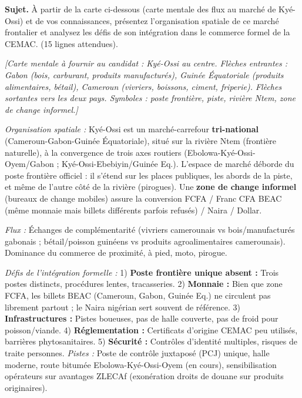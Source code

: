 \documentclass[11pt]{article}
\begin{document}
\begin{exercice}
\textbf{Sujet.} À partir de la carte ci-dessous (carte mentale des flux au marché de Kyé-Ossi) et de vos connaissances, présentez l'organisation spatiale de ce marché frontalier et analysez les défis de son intégration dans le commerce formel de la CEMAC. (15 lignes attendues).
\begin{center}
\textit{[Carte mentale à fournir au candidat : Kyé-Ossi au centre. Flèches entrantes : Gabon (bois, carburant, produits manufacturés), Guinée Équatoriale (produits alimentaires, bétail), Cameroun (vivriers, boissons, ciment, friperie). Flèches sortantes vers les deux pays. Symboles : poste frontière, piste, rivière Ntem, zone de change informel.]}
\end{center}
\end{exercice}

\begin{corrige}
\emph{Organisation spatiale :} Kyé-Ossi est un marché-carrefour \textbf{tri-national} (Cameroun-Gabon-Guinée Équatoriale), situé sur la rivière Ntem (frontière naturelle), à la convergence de trois axes routiers (Ebolowa-Kyé-Ossi-Oyem/Gabon ; Kyé-Ossi-Ebebiyin/Guinée Eq.). L'espace de marché déborde du poste frontière officiel : il s'étend sur les places publiques, les abords de la piste, et même de l'autre côté de la rivière (pirogues). Une \textbf{zone de change informel} (bureaux de change mobiles) assure la conversion FCFA / Franc CFA BEAC (même monnaie mais billets différents parfois refusés) / Naira / Dollar.

\emph{Flux :} Échanges de complémentarité (vivriers camerounais vs bois/manufacturés gabonais ; bétail/poisson guinéens vs produits agroalimentaires camerounais). Dominance du commerce de proximité, à pied, moto, pirogue.

\emph{Défis de l'intégration formelle :} 1) \textbf{Poste frontière unique absent :} Trois postes distincts, procédures lentes, tracasseries. 2) \textbf{Monnaie :} Bien que zone FCFA, les billets BEAC (Cameroun, Gabon, Guinée Eq.) ne circulent pas librement partout ; le Naira nigérian sert souvent de référence. 3) \textbf{Infrastructures :} Pistes boueuses, pas de halle couverte, pas de froid pour poisson/viande. 4) \textbf{Réglementation :} Certificats d'origine CEMAC peu utilisés, barrières phytosanitaires. 5) \textbf{Sécurité :} Contrôles d'identité multiples, risques de traite personnes.
\emph{Pistes :} Poste de contrôle juxtaposé (PCJ) unique, halle moderne, route bitumée Ebolowa-Kyé-Ossi-Oyem (en cours), sensibilisation opérateurs sur avantages ZLECAf (exonération droits de douane sur produits originaires).
\end{corrige}
\end{document}
